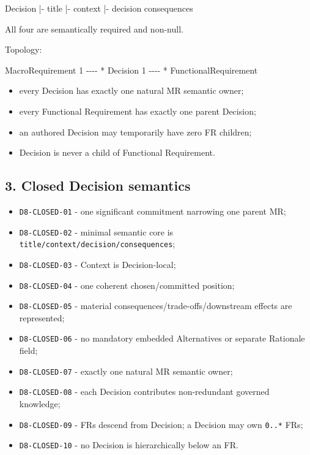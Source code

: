 \documentclass[
  10pt,
]{article}
\newenvironment{Shaded}{}{}
\newcommand{\NormalTok}[1]{#1}
\providecommand{\tightlist}{%
  \setlength{\itemsep}{0pt}\setlength{\parskip}{0pt}}
\begin{document}
\begin{Shaded}
\begin{Highlighting}[]
\NormalTok{Decision}
\NormalTok{|{-} title}
\NormalTok{|{-} context}
\NormalTok{|{-} decision}
\NormalTok{\textasciigrave{}{-} consequences}
\end{Highlighting}
\end{Shaded}

All four are semantically required and non-null.

Topology:

\begin{Shaded}
\begin{Highlighting}[]
\NormalTok{MacroRequirement 1 {-}{-}{-}{-} * Decision 1 {-}{-}{-}{-} * FunctionalRequirement}
\end{Highlighting}
\end{Shaded}

\begin{itemize}
\tightlist
\item
  every Decision has exactly one natural MR semantic owner;
\item
  every Functional Requirement has exactly one parent Decision;
\item
  an authored Decision may temporarily have zero FR children;
\item
  Decision is never a child of Functional Requirement.
\end{itemize}

\subsection{3. Closed Decision
semantics}\label{3-closed-decision-semantics}

\begin{itemize}
\tightlist
\item
  \texttt{D8-CLOSED-01} - one significant commitment narrowing one
  parent MR;
\item
  \texttt{D8-CLOSED-02} - minimal semantic core is
  \texttt{title/context/decision/consequences};
\item
  \texttt{D8-CLOSED-03} - Context is Decision-local;
\item
  \texttt{D8-CLOSED-04} - one coherent chosen/committed position;
\item
  \texttt{D8-CLOSED-05} - material consequences/trade-offs/downstream
  effects are represented;
\item
  \texttt{D8-CLOSED-06} - no mandatory embedded Alternatives or separate
  Rationale field;
\item
  \texttt{D8-CLOSED-07} - exactly one natural MR semantic owner;
\item
  \texttt{D8-CLOSED-08} - each Decision contributes non-redundant
  governed knowledge;
\item
  \texttt{D8-CLOSED-09} - FRs descend from Decision; a Decision may own
  \texttt{0..*} FRs;
\item
  \texttt{D8-CLOSED-10} - no Decision is hierarchically below an FR.
\end{itemize}
\end{document}
